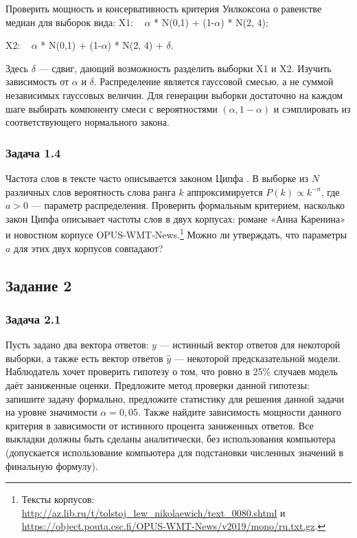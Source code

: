 Проверить мощность и консервативность критерия Уилкоксона о равенстве медиан для выборок вида:
X1: ~ $\alpha$ * N(0,1) + (1-$\alpha$) * N(2, 4);

X2: ~ $\alpha$ * N(0,1) + (1-$\alpha$) * N(2, 4) + $\delta$.

Здесь $\delta$ --- сдвиг, дающий возможность разделить выборки X1 и X2.
Изучить зависимость от $\alpha$ и $\delta$.
Распределение является гауссовой смесью, а не суммой независимых гауссовых величин. Для генерации выборки достаточно на каждом шаге выбирать компоненту смеси с вероятностями $(\alpha, 1-\alpha)$ и сэмплировать из соответствующего нормального закона.

\subsubsection{Задача 1.4}

Частота слов в тексте часто описывается законом Ципфа \citep{zipf1949}. В выборке из $N$ различных слов вероятность слова ранга $k$ аппроксимируется $P(k) \propto k^{-a}$, где $a>0$ --- параметр распределения.
Проверить формальным критерием, насколько закон Ципфа описывает частоты слов в двух корпусах: романе «Анна Каренина» и новостном корпусе OPUS-WMT-News.\footnote{Тексты корпусов: \url{http://az.lib.ru/t/tolstoj_lew_nikolaewich/text_0080.shtml} и \url{https://object.pouta.csc.fi/OPUS-WMT-News/v2019/mono/ru.txt.gz}.}
Можно ли утверждать, что параметры $a$ для этих двух корпусов совпадают?

\subsection{Задание 2}


\subsubsection{Задача 2.1}

Пусть задано два вектора ответов: $y$ --- истинный вектор ответов для некоторой выборки, а также есть вектор ответов $\hat{y}$ --- некоторой предсказательной модели. Наблюдатель хочет проверить гипотезу о том, что ровно в 25\% случаев модель даёт заниженные оценки.
Предложите метод проверки данной гипотезы: запишите задачу формально,
предложите статистику для решения данной задачи на уровне значимости $\alpha=0{,}05$.
Также найдите зависимость мощности данного критерия в зависимости от истинного процента заниженных ответов.
Все выкладки должны быть сделаны аналитически, без использования компьютера (допускается использование компьютера для подстановки численных значений в финальную формулу).


